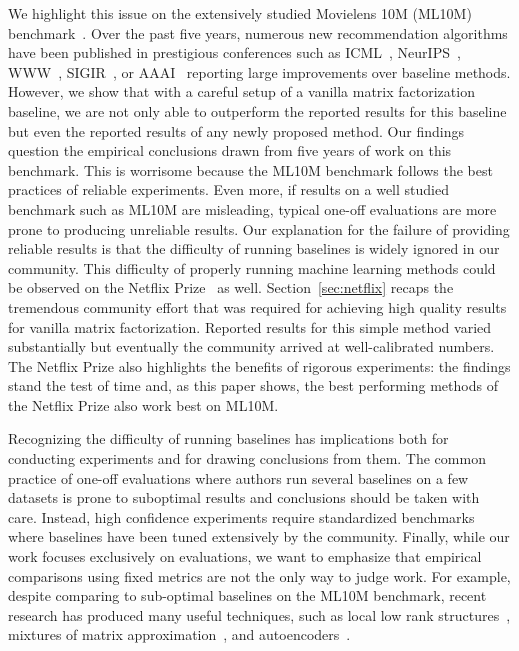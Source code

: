\documentclass{article}
\begin{document}
We highlight this issue on the extensively studied Movielens 10M (ML10M) benchmark~\cite{harper:2015}.
Over the past five years, numerous new recommendation algorithms have been published in prestigious conferences such as ICML~\cite{lee:icml13,li:icml16,zheng:icml16}, NeurIPS~\cite{li:nips17}, WWW~\cite{sedhain:www15,li:www18}, SIGIR~\cite{chen:sigir15}, or AAAI~\cite{li:aaai17,chen:aaai17} reporting large improvements over baseline methods.
However, we show that with a careful setup of a vanilla matrix factorization baseline, we are not only able to outperform the reported results for this baseline but even the reported results of any newly proposed method.
Our findings question the empirical conclusions drawn from five years of work on this benchmark.
This is worrisome because the ML10M benchmark follows the best practices of reliable experiments.
Even more, if results on a well studied benchmark such as ML10M are misleading, typical one-off evaluations are more prone to producing unreliable results.
Our explanation for the failure of providing reliable results is that the difficulty of running baselines is widely ignored in our community.
This difficulty of properly running machine learning methods could be observed on the Netflix Prize~\cite{bennett:kddcup07} as well.
Section~\ref{sec:netflix} recaps the tremendous community effort that was required for achieving high quality results for vanilla matrix factorization.
Reported results for this simple method varied substantially but eventually the community arrived at well-calibrated numbers.
The Netflix Prize also highlights the benefits of rigorous experiments: the findings stand the test of time and, as this paper shows, the best performing methods of the Netflix Prize also work best on ML10M.

Recognizing the difficulty of running baselines has implications both for conducting experiments and for drawing conclusions from them.
The common practice of one-off evaluations where authors run several baselines on a few datasets is prone to suboptimal results and conclusions should be taken with care.
Instead, high confidence experiments require standardized benchmarks where baselines have been tuned extensively by the community.
Finally, while our work focuses exclusively on evaluations, we want to emphasize that empirical comparisons using fixed metrics are not the only way to judge work.
For example, despite comparing to sub-optimal baselines on the ML10M benchmark, recent research has produced many useful techniques, such as local low rank structures~\cite{lee:icml13}, mixtures of matrix approximation~\cite{li:nips17}, and autoencoders~\cite{sedhain:www15}.
\end{document}
